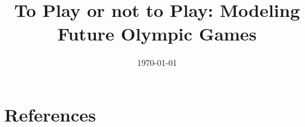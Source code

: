 \documentclass{mcmthesis}
\title{\fontsize{16}{18}\selectfont To Play or not to Play: Modeling Future Olympic Games}
\author{\team}
\date{\today}
\begin{document}


\maketitle



%

\thispagestyle{empty}
\setcounter{page}{-1} %
\pagestyle{fancy}
\fancyhf{}  
\lhead{\team}
\cfoot{\thepage}
\renewcommand{\headrulewidth}{1pt}

\newpage
\begin{center}
    \begin{spacing}{0.5}
	   \tableofcontents
    \end{spacing}
\end{center}
\newpage










\section{References}
\printbibliography[heading=none]

\appendix



	

\end{document}
